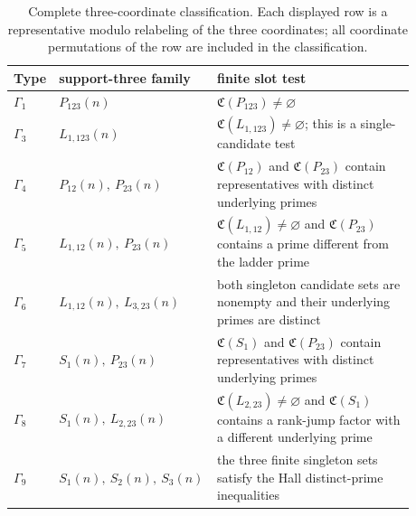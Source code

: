\begin{theorem}
\begin{table}[ht]
\centering
\small
\caption{Complete three-coordinate classification. Each displayed row is a
representative modulo relabeling of the three coordinates; all coordinate
permutations of the row are included in the classification.}
\label{tab:three-coordinate-classification}
\begin{tabular}{p{0.10\linewidth}p{0.29\linewidth}p{0.49\linewidth}}
\toprule
Type & support-three family & finite slot test\\
\midrule
$\Gamma_1$ & $P_{123}(n)$ & $\mathfrak C(P_{123})\ne\varnothing$\\
$\Gamma_3$ & $L_{1,123}(n)$ & $\mathfrak C(L_{1,123})\ne\varnothing$; this is a single-candidate test\\
$\Gamma_4$ & $P_{12}(n),\ P_{23}(n)$ & $\mathfrak C(P_{12})$ and $\mathfrak C(P_{23})$ contain representatives with distinct underlying primes\\
$\Gamma_5$ & $L_{1,12}(n),\ P_{23}(n)$ & $\mathfrak C(L_{1,12})\ne\varnothing$ and $\mathfrak C(P_{23})$ contains a prime different from the ladder prime\\
$\Gamma_6$ & $L_{1,12}(n),\ L_{3,23}(n)$ & both singleton candidate sets are nonempty and their underlying primes are distinct\\
$\Gamma_7$ & $S_1(n),\ P_{23}(n)$ & $\mathfrak C(S_1)$ and $\mathfrak C(P_{23})$ contain representatives with distinct underlying primes\\
$\Gamma_8$ & $S_1(n),\ L_{2,23}(n)$ & $\mathfrak C(L_{2,23})\ne\varnothing$ and $\mathfrak C(S_1)$ contains a rank-jump factor with a different underlying prime\\
$\Gamma_9$ & $S_1(n),\ S_2(n),\ S_3(n)$ & the three finite singleton sets satisfy the Hall distinct-prime inequalities\\
\bottomrule
\end{tabular}
\end{table}

\end{theorem}

